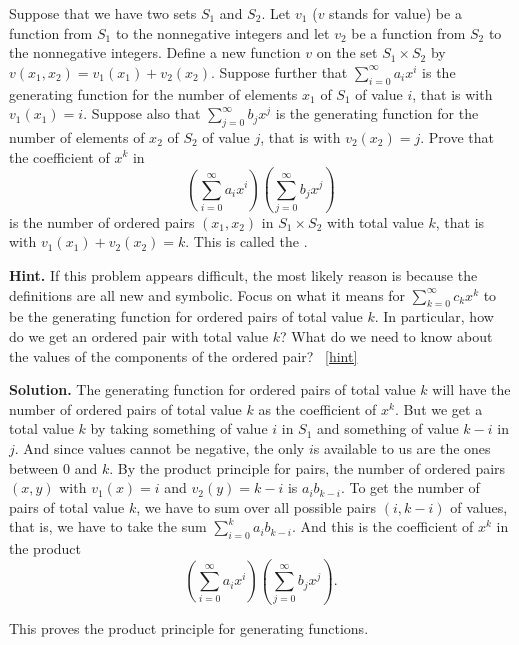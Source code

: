 \documentclass{book}
\begin{document}
\setcounter{project}{249}
\addtocounter{project}{-1}
\begin{activity}[]\label{ProductPrincipleOGF}
\hypertarget{p-1314}{}%
Suppose that we have two sets \(S_1\) and \(S_2\). Let \(v_1\) (\(v\) stands for value) be a function from \(S_1\) to the nonnegative integers and let \(v_2\) be a function from \(S_2\) to the nonnegative integers.  Define a new function \(v\) on the set \(S_1 \times S_2\) by \(v(x_1,x_2) = v_1(x_1) +v_2(x_2)\). Suppose further that \(\sum_{i=0}^\infty a_ix^i\) is the generating function for the number of elements \(x_1\) of \(S_1\) of value \(i\), that is with \(v_1(x_1)=i\). Suppose also that \(\sum_{j=0}^\infty b_j x^j\) is the generating function for the number of elements of \(x_2\) of \(S_2\) of value \(j\), that is with \(v_2(x_2) = j\).  Prove that the coefficient of \(x^k\) in%
\begin{equation*}
\left(\sum_{i=0}^\infty a_ix^i\right)\left(\sum_{j=0}^\infty
b_jx^j\right)
\end{equation*}
is the number of ordered pairs \((x_1,x_2)\) in \(S_1\times S_2\) with total value \(k\), that is with \(v_1(x_1) +v_2(x_2) =k\). This is called the .%
\par\smallskip%
\noindent\textbf{Hint.}\hypertarget{hint-158}{}\quad%
\hypertarget{p-1315}{}%
If this problem appears difficult, the most likely reason is because the definitions are all new and symbolic. Focus on what it means for \(\sum_{k=0}^\infty c_kx^k\) to be the generating function for ordered pairs of total value \(k\). In particular, how do we get an ordered pair with total value \(k\)? What do we need to know about the values of the components of the ordered pair?%
~\hfill{\tiny\hyperlink{a-249}{[hint]}\hypertarget{q-249}{}}\par\smallskip%
\noindent\textbf{Solution.}\hypertarget{solution-149}{}\quad%
\hypertarget{p-1316}{}%
The generating function for ordered pairs of total value \(k\) will have the number of ordered pairs of total value \(k\) as the coefficient of \(x^k\). But we get a total value \(k\) by taking something of value \(i\) in \(S_1\) and something of value \(k-i\) in \(j\). And since values cannot be negative, the only \(i\)s available to us are the ones between \(0\) and \(k\). By the product principle for pairs, the number of ordered pairs \((x,y)\) with \(v_1(x)=i\) and \(v_2(y)=k-i\) is \(a_ib_{k-i}\). To get the number of pairs of total value \(k\), we have to sum over all possible pairs \((i,k-i)\) of values, that is, we have to take the sum \(\sum_{i=0}^k a_ib_{k-i}\). And this is the coefficient of \(x^k\) in the product%
\begin{equation*}
\left(\sum_{i=0}^\infty a_ix^i\right)\left(\sum_{j=0}^\infty
b_jx^j\right).
\end{equation*}
%
\par
\hypertarget{p-1317}{}%
This proves the product principle for generating functions.%
\end{activity}

\clearpage
\end{document}
